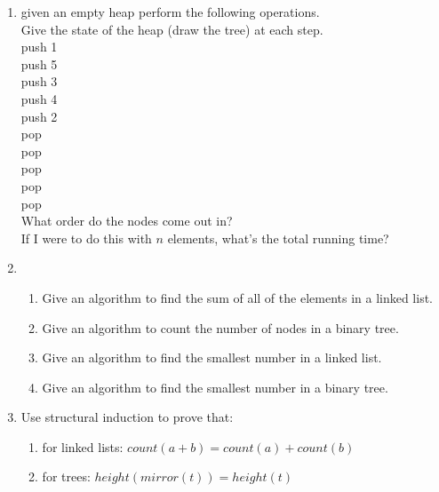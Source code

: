 \documentclass[basic, header]{nosvagor-notes}
\begin{document}
\begin{enumerate}

  \item
given an empty heap perform the following operations.\\
Give the state of the heap (draw the tree) at each step.\\
push 1 \\
push 5 \\
push 3 \\
push 4 \\
push 2 \\
pop \\
pop \\
pop \\
pop \\
pop \\
$\ $\\
What order do the nodes come out in?\\
If I were to do this with $n$ elements, what's the total running time?\\

\newpage

\item

  \begin{enumerate}[itemsep=4em]
    \item Give an algorithm to find the sum of all of the elements in a linked list.
    \item Give an algorithm to count the number of nodes in a binary tree.
    \item Give an algorithm to find the smallest number in a linked list.
    \item Give an algorithm to find the smallest number in a binary tree.
  \end{enumerate}

\newpage

\item

Use structural induction to prove that:
\begin{enumerate}
  \item for linked lists: $count(a + b) = count(a) + count(b)$

  \item for trees: $height(mirror(t)) = height(t)$
\end{enumerate}

  \newpage %


\end{enumerate}
\end{document}
